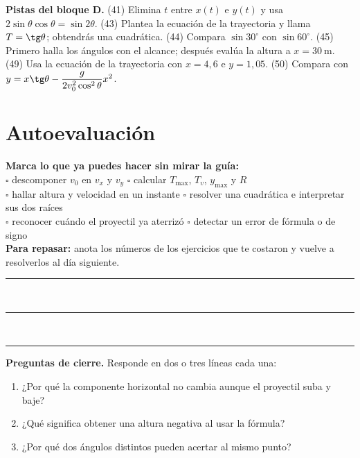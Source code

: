 \documentclass[12pt, letterpaper]{article}
\providecommand{\sen}{\sin}
\begin{document}
\begin{cuadroextra}
  \small
  \textbf{Pistas del bloque D.} (41) Elimina $t$ entre $x(t)$ e $y(t)$ y usa
  $2\sen\theta\cos\theta=\sen2\theta$. (43) Plantea la ecuación de la
  trayectoria y llama $T=\tg\theta$; obtendrás una cuadrática. (44) Compara
  $\sen30^\circ$ con $\sen60^\circ$. (45) Primero halla los ángulos con el
  alcance; después evalúa la altura a $x=30\ \text{m}$. (49) Usa la ecuación
  de la trayectoria con $x=4{,}6$ e $y=1{,}05$. (50) Compara con
  $y=x\tg\theta-\dfrac{g}{2v_0^2\cos^2\theta}x^2$.
\end{cuadroextra}

\section{Autoevaluación}

\begin{cuadroinfo}
  \small
  \textbf{Marca lo que ya puedes hacer sin mirar la guía:}
  \\[4pt]
  $\square$ descomponer $v_0$ en $v_x$ y $v_y$ \quad
  $\square$ calcular $T_{\max}$, $T_v$, $y_{\max}$ y $R$ \\[2pt]
  $\square$ hallar altura y velocidad en un instante \quad
  $\square$ resolver una cuadrática e interpretar sus dos raíces \\[2pt]
  $\square$ reconocer cuándo el proyectil ya aterrizó \quad
  $\square$ detectar un error de fórmula o de signo \\[4pt]
  \textbf{Para repasar:} anota los números de los ejercicios que te costaron
  y vuelve a resolverlos al día siguiente.
  \\[8pt]
  \noindent\rule{\linewidth}{0.4pt}\\[8pt]
  \noindent\rule{\linewidth}{0.4pt}\\[8pt]
  \noindent\rule{\linewidth}{0.4pt}
\end{cuadroinfo}

\begin{cuadroteoria}
  \small
  \textbf{Preguntas de cierre.} Responde en dos o tres líneas cada una:
  \begin{enumerate}[leftmargin=1.4em, nosep, topsep=2pt]
    \item ¿Por qué la componente horizontal no cambia aunque el proyectil
          suba y baje?
    \item ¿Qué significa obtener una altura negativa al usar la fórmula?
    \item ¿Por qué dos ángulos distintos pueden acertar al mismo punto?
  \end{enumerate}
\end{cuadroteoria}
\end{document}
